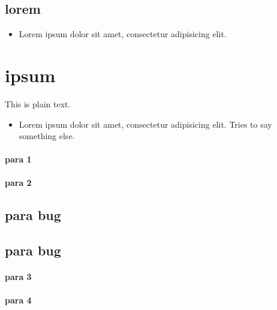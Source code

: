\subsection{lorem}
\label{autosec:3}
    \begin{itemize}[noitemsep]
        \item Lorem ipsum dolor sit amet, consectetur adipisicing elit.
    \end{itemize}
\section{ipsum}
\label{autosec:4}
This is plain text.
    \begin{itemize}[noitemsep]
        \item Lorem ipsum dolor sit amet, consectetur adipisicing elit.
Tries to say something else.
    \end{itemize}
\paragraph{para 1}
\label{autosec:5}
\paragraph{para 2}
\label{autosec:5}
\subsection{para bug}
\label{autosec:5}
\vspace{-36pt}\hspace{11pt}
\subsection{para bug}
\label{autosec:6}
\vspace{-36pt}\hspace{11pt}
\paragraph{para 3}
\label{autosec:7}
\paragraph{para 4}
\label{autosec:7}
